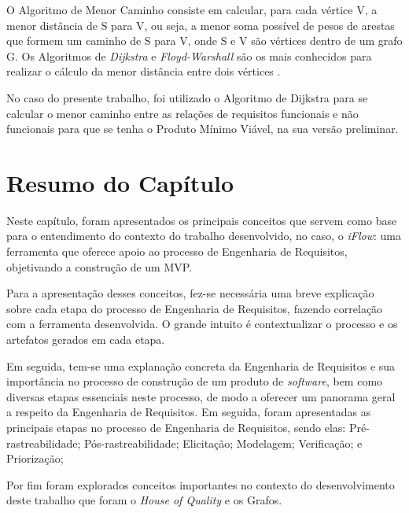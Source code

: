 \label{sec:ssp}

O Algoritmo de Menor Caminho consiste em calcular, para cada vértice V, a menor distância de S para V, ou seja, a menor soma possível de pesos de arestas que formem um caminho de S para V, onde S e V são vértices dentro de um grafo G. Os Algoritmos de \textit{Dijkstra} e \textit{Floyd-Warshall} são os mais conhecidos para realizar o cálculo da menor distância entre dois vértices \cite{even2011graph}.

No caso do presente trabalho, foi utilizado o Algoritmo de Dijkstra para se calcular o menor caminho entre as relações de requisitos funcionais e não funcionais para que se tenha o Produto Mínimo Viável, na sua versão preliminar.

\section{Resumo do Capítulo}

\label{sec:resumo_embasamento}

Neste capítulo, foram apresentados os principais conceitos que servem como base para o entendimento do contexto do trabalho desenvolvido, no caso, o \textit{iFlow}: uma ferramenta que oferece apoio ao processo de Engenharia de Requisitos, objetivando a construção de um MVP.

Para a apresentação desses conceitos, fez-se necessária uma breve explicação sobre cada etapa do processo de Engenharia de Requisitos, fazendo correlação com a ferramenta desenvolvida. O grande intuito é contextualizar o processo e os artefatos gerados em cada etapa.

Em seguida, tem-se uma explanação concreta da Engenharia de Requisitos e sua importância no processo de construção de um produto de \textit{software}, bem como diversas etapas essenciais neste processo, de modo a oferecer um panorama geral a respeito da Engenharia de Requisitos. Em seguida, foram apresentadas as principais etapas no processo de Engenharia de Requisitos, sendo elas: Pré-rastreabilidade; Pós-rastreabilidade; Elicitação; Modelagem; Verificação; e Priorização;

Por fim foram explorados conceitos importantes no contexto do desenvolvimento deste trabalho que foram o \textit{House of Quality} e os Grafos.